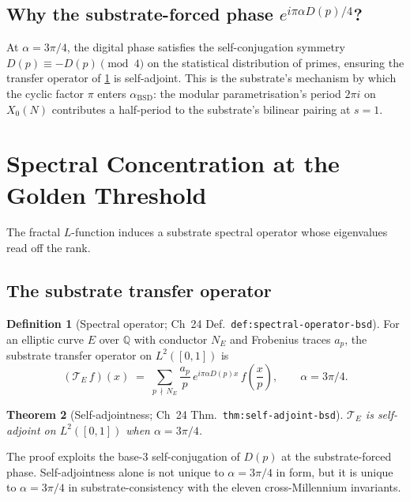 \documentclass[11pt,a4paper]{article}
\theoremstyle{plain}
\newtheorem{theorem}{Theorem}[section]
\theoremstyle{definition}
\newtheorem{definition}[theorem]{Definition}
\theoremstyle{remark}
\newcommand{\Q}{\mathbb{Q}}
\begin{document}
\subsection*{Why the substrate-forced phase $e^{i\pi\alpha D(p)/4}$?}

At $\alpha = 3\pi/4$, the digital phase satisfies the
self-conjugation symmetry $D(p) \equiv -D(p) \pmod{4}$ on the
statistical distribution of primes, ensuring the transfer operator
of \cref{sec:spectral} is self-adjoint. This is the substrate's
mechanism by which the cyclic factor $\pi$ enters
$\alpha_{\mathrm{BSD}}$: the modular parametrisation's period
$2\pi i$ on $X_{0}(N)$ contributes a half-period
to the substrate's bilinear pairing at $s = 1$.

\section{Spectral Concentration at the Golden Threshold}
\label{sec:spectral}

The fractal $L$-function induces a substrate spectral operator
whose eigenvalues read off the rank.

\subsection{The substrate transfer operator}

\begin{definition}[Spectral operator;
                   Ch~24 Def.~\texttt{def:spectral-operator-bsd}]
\label{def:T_E}
For an elliptic curve $E$ over $\Q$ with conductor $N_{E}$ and
Frobenius traces $a_{p}$, the substrate transfer operator on
$L^{2}([0, 1])$ is
\[
(\mathcal{T}_{E}\,f)(x)
\;=\;
\sum_{p\,\nmid\,N_{E}} \frac{a_{p}}{p}\,
   e^{i\pi\alpha D(p) x}\,
   f\!\left(\frac{x}{p}\right),
\qquad \alpha = 3\pi/4.
\]
\end{definition}

\begin{theorem}[Self-adjointness;
                Ch~24 Thm.~\texttt{thm:self-adjoint-bsd}]
\label{thm:self-adjoint}
$\mathcal{T}_{E}$ is self-adjoint on $L^{2}([0, 1])$ when
$\alpha = 3\pi/4$.
\end{theorem}

The proof exploits the base-$3$ self-conjugation of $D(p)$ at the
substrate-forced phase. Self-adjointness alone is not unique to
$\alpha = 3\pi/4$ in form, but it is unique to $\alpha = 3\pi/4$ in
substrate-consistency with the eleven cross-Millennium invariants.
\end{document}
